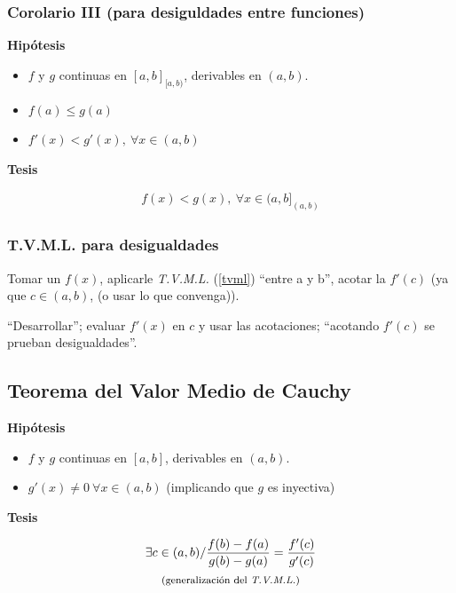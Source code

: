 \documentclass[11pt,titlepage]{article}
\newcommand{\littleTitle}[1]{
	\noindent \ignorespaces
	\small \textbf{#1} \normalsize
	\ignorespaces \ignorespacesafterend
}
\newcommand{\comillas}[1]{``#1''}
\begin{document}
\subsubsection{Corolario III \footnotesize{(para desiguldades entre funciones)}}
\begin{commBoxy}
	\littleTitle{Hipótesis}
	\begin{itemize}
		\item $f$ y $g$ continuas en ${[a,b]}_{[a,b)}$, derivables en $(a,b)$.
		\item $f(a) \leq g(a)$
		\item $f'(x) < g'(x), \ \forall x \in (a,b)$
	\end{itemize}

	\littleTitle{Tesis}
	\begin{gather*}
		f(x) < g(x), \ \forall x \in {(a,b]}_{(a,b)}
	\end{gather*}
\end{commBoxy}

\subsubsection{T.V.M.L. para desigualdades}
Tomar un $f(x)$, aplicarle \emph{T.V.M.L.} (\ref{tvml}) \comillas{entre a y b}, acotar la $f'(c)$ (ya que $c \in (a,b)$, (o 
usar lo que convenga)).\par
\comillas{Desarrollar}; evaluar $f'(x)$ en $c$ y usar las acotaciones; \comillas{acotando $f'(c)$ se prueban 
desigualdades}.

\subsection{Teorema del Valor Medio de Cauchy}
\begin{commBoxy}
	\littleTitle{Hipótesis}
	\begin{itemize}
		\item $f$ y $g$ continuas en $[a,b]$, derivables en $(a,b)$.
		\item $g'(x) \neq 0 \ \forall x \in (a,b)$ \footnotesize(implicando que $g$ es inyectiva)
	\end{itemize}

	\littleTitle{Tesis}
	\begin{gather*}
		\exists c \in (a,b) / \frac{f(b) - f(a)}{g(b) - g(a)} = \frac{f'(c)}{g'(c)} \\ 
		\text{\footnotesize (generalización del \emph{T.V.M.L.})}
	\end{gather*}
\end{commBoxy}
\end{document}
